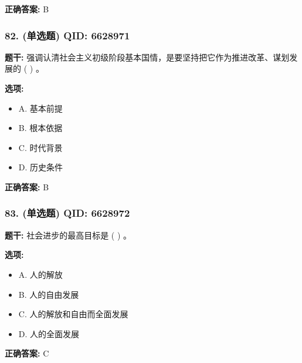 \documentclass[12pt,UTF8]{ctexart}
\begin{document}
\textbf{正确答案:}
B

\vspace{0.3em}\hrulefill\vspace{0.7em}

\subsubsection*{82. (单选题) \small QID: 6628971}

\textbf{题干:}
强调认清社会主义初级阶段基本国情，是要坚持把它作为推进改革、谋划发展的  ( )  。

\textbf{选项:}
\begin{itemize}[leftmargin=*]

  \item A. 基本前提

  \item B. 根本依据

  \item C. 时代背景

  \item D. 历史条件

\end{itemize}

\textbf{正确答案:}
B

\vspace{0.3em}\hrulefill\vspace{0.7em}

\subsubsection*{83. (单选题) \small QID: 6628972}

\textbf{题干:}
社会进步的最高目标是  ( )  。

\textbf{选项:}
\begin{itemize}[leftmargin=*]

  \item A. 人的解放

  \item B. 人的自由发展

  \item C. 人的解放和自由而全面发展

  \item D. 人的全面发展

\end{itemize}

\textbf{正确答案:}
C

\vspace{0.3em}\hrulefill\vspace{0.7em}
\end{document}
